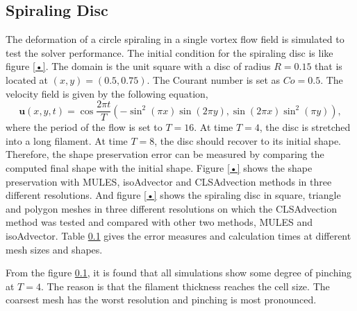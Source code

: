 \subsection{Spiraling Disc}
The deformation of a circle spiraling in a single vortex flow field is simulated to test the solver performance. The initial condition for the spiraling disc is like figure \ref{•}. The domain is the unit square with a disc of radius $R=0.15$ that is located at $(x,y) = (0.5,0.75)$. The Courant number is set as $Co = 0.5$. The velocity field is given by the following equation,
\begin{equation}
\label{31}
\mathbf{u}(x,y,t)=\cos{\frac{2\pi{t}}{T}}( -\sin^2(\pi{x})\sin(2\pi{y}),\sin(2\pi{x})\sin^2(\pi{y})),
\end{equation}
where the period of the flow is set to $T=16$. At time $T=4$, the disc is stretched into a long filament. At time $T=8$, the disc should recover to its initial shape. Therefore, the shape preservation error can be measured by comparing the computed final shape with the initial shape. Figure \ref{•} shows the shape preservation with MULES, isoAdvector and CLSAdvection methods in three different resolutions. And figure \ref{•} shows the spiraling disc in square, triangle and polygon meshes in three different resolutions on which the CLSAdvection method was tested and compared with other two methods, MULES and isoAdvector. Table \ref{} gives the error measures and calculation times at different mesh sizes and shapes.  

From the figure \ref{}, it is found that all simulations show some degree of pinching at $T=4$. The reason is that the filament thickness reaches the cell size. The coarsest mesh has the worst resolution and pinching is most pronounced. 